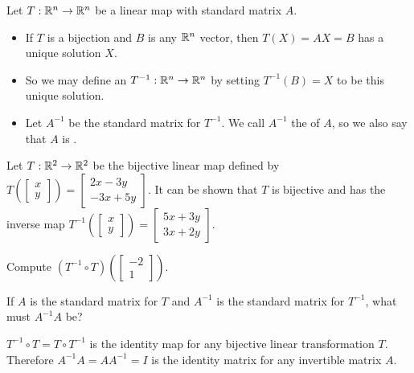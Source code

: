 \begin{applicationActivities}

\begin{definition}
  Let $T: \mathbb{R}^n \rightarrow \mathbb{R}^n$ be a linear map with standard matrix $A$.
\begin{itemize}
\item  If $T$ is a bijection and $B$ is any $\mathbb{R}^n$ vector, then $T(X)=AX=B$ has a unique solution $X$.
\item So we may define an  $T^{-1} : \mathbb{R}^n \rightarrow \mathbb{R}^n$ by setting $T^{-1}(B)=X$ to be this unique solution.
\item Let $A^{-1}$ be the standard matrix for $T^{-1}$. We call $A^{-1}$ the
 of $A$, so we also say that $A$ is .
\end{itemize}
\end{definition}

\begin{activity}{10}
  Let \(T:\mathbb{R}^2\to\mathbb{R}^2\) be the bijective linear map defined by
  \(T\left(\begin{bmatrix}x\\y\end{bmatrix}\right)=\begin{bmatrix} 2x -3y \\ -3x + 5y\end{bmatrix}\). It can be shown that \(T\) is bijective and
  has the inverse map
  \(T^{-1}\left(\begin{bmatrix}x\\y\end{bmatrix}\right)=\begin{bmatrix} 5x+ 3y \\ 3x + 2y\end{bmatrix}\).
  \begin{subactivity}
    Compute \((T^{-1}\circ T)\left(\begin{bmatrix}-2\\1\end{bmatrix}\right)\).
  \end{subactivity}
  \begin{subactivity}
    If \(A\) is the standard matrix for \(T\) and \(A^{-1}\) is the
    standard matrix for \(T^{-1}\), what must \(A^{-1}A\) be?
  \end{subactivity}
\end{activity}

\begin{observation}
  \(T^{-1}\circ T=T\circ T^{-1}\) is the identity map for any bijective
  linear transformation \(T\). Therefore
  \(A^{-1}A=AA^{-1}=I\) is the identity matrix for any invertible matrix
  \(A\).
\end{observation}



\end{applicationActivities}
